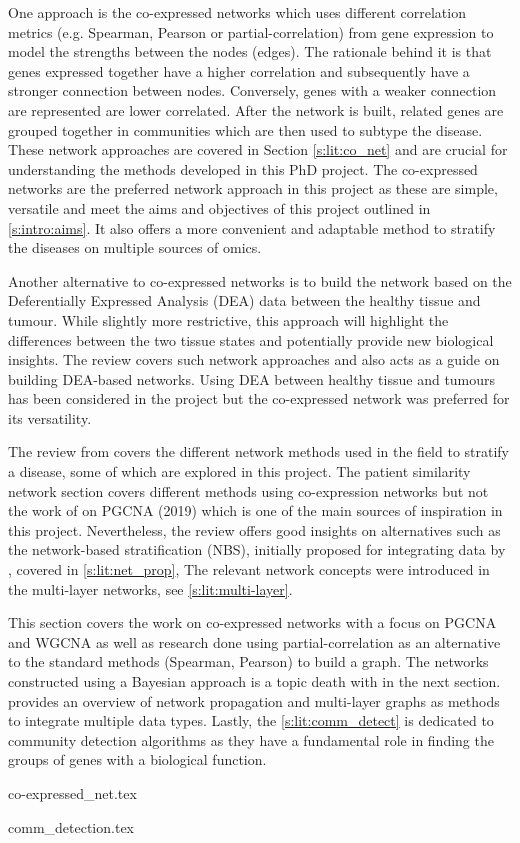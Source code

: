 One approach is the co-expressed networks which uses different correlation metrics (e.g. Spearman, Pearson or partial-correlation) from gene expression to model the strengths between the nodes (edges). The rationale behind it is that genes expressed together have a higher correlation and subsequently have a stronger connection between nodes. Conversely, genes with a weaker connection are represented are lower correlated. After the network is built, related genes are grouped together in communities which are then used to subtype the disease. These network approaches are covered in Section \ref{s:lit:co_net} and are crucial for understanding the methods developed in this PhD project. The co-expressed networks are the preferred network approach in this project as these are simple, versatile and meet the aims and objectives of this project outlined in \cref{s:intro:aims}. It also offers a more convenient and adaptable method to stratify the diseases on multiple sources of omics.

Another alternative to co-expressed networks is to build the network based on the Deferentially Expressed Analysis (DEA) data between the healthy tissue and tumour. While slightly more restrictive, this approach will highlight the differences between the two tissue states and potentially provide new biological insights. The review \citet{Van_Dam2018-id} covers such network approaches and also acts as a guide on building DEA-based networks. Using DEA between healthy tissue and tumours has been considered in the project but the co-expressed network was preferred for its versatility.

The review from \citet{Petti2023-qo} covers the different network methods used in the field to stratify a disease, some of which are explored in this project. The patient similarity network section covers different methods using co-expression networks but not the work of \citet{Care2019-ij} on PGCNA (2019) which is one of the main sources of inspiration in this project. Nevertheless, the review offers good insights on alternatives such as the network-based stratification (NBS), initially proposed for integrating data by \citet{Hofree2013-ld}, covered in \cref{s:lit:net_prop}, The relevant network concepts were introduced in  the multi-layer networks, see \cref{s:lit:multi-layer}.

This section covers the work on co-expressed networks with a focus on PGCNA and WGCNA as well as research done using partial-correlation as an alternative to the standard methods (Spearman, Pearson) to build a graph. The networks constructed using a Bayesian approach is a topic death with in the next section.  provides an overview of network propagation and multi-layer graphs as methods to integrate multiple data types. Lastly, the \cref{s:lit:comm_detect} is dedicated to community detection algorithms as they have a fundamental role in finding the groups of genes with a biological function.

{co-expressed_net.tex}

{comm_detection.tex}





